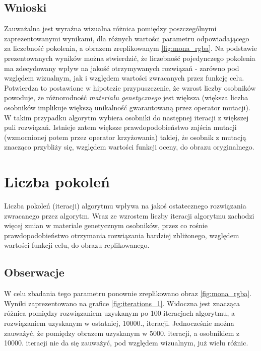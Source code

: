 \subsection{Wnioski}
Zauważalna jest wyraźna wizualna różnica pomiędzy poszczególnymi zaprezentowanymi wynikami, dla różnych wartości parametru odpowiadającego za liczebność pokolenia, a obrazem zreplikowanym \ref{fig:mona_rgba}. Na podstawie prezentowanych wyników można stwierdzić, że liczebność pojedynczego pokolenia ma zdecydowany wpływ na jakość otrzymywanych rozwiązań - zarówno pod względem wizualnym, jak i względem wartości zwracanych przez funkcję celu. Potwierdza to postawione w hipotezie przypuszczenie, że wzrost liczby osobników powoduje, że różnorodność \textit{materiału genetycznego} jest większa (większa liczba osobników implikuje większą unikalność gwarantowaną przez operator mutacji). W takim przypadku algorytm wybiera osobniki do następnej iteracji z większej puli rozwiązań. Istnieje zatem większe prawdopodobieństwo zajścia mutacji (wzmocnionej potem przez operator krzyżowania) takiej, że osobnik z mutacją znacząco przybliży się, względem wartości funkcji oceny, do obrazu oryginalnego.

\section{Liczba pokoleń}
\begin{hypothesis}
Liczba pokoleń (iteracji) algorytmu wpływa na jakoś ostatecznego rozwiązania zwracanego przez algorytm. Wraz ze wzrostem liczby iteracji algorytmu zachodzi więcej zmian w materiale genetycznym osobników, przez co rośnie prawdopodobieństwo otrzymania rozwiązania bardziej zbliżonego, względem wartości funkcji celu, do obrazu replikowanego.
\end{hypothesis}

\subsection{Obserwacje}
W celu zbadania tego parametru ponownie zreplikowano obraz \ref{fig:mona_rgba}. Wyniki zaprezentowano na grafice \ref{fig:iterations_1}. Widoczna jest znacząca różnica pomiędzy rozwiązaniem uzyskanym po 100 iteracjach algorytmu, a rozwiązaniem uzyskanym w ostatniej, 10000., iteracji. Jednocześnie można zauważyć, że pomiędzy obrazem uzyskanym w 5000. iteracji, a osobnikiem z 10000. iteracji nie da się zauważyć, pod względem wizualnym, już wielu różnic.

